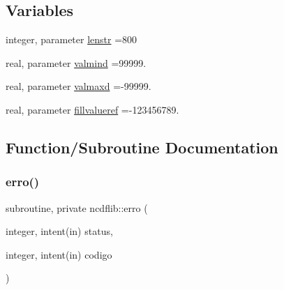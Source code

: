 \subsection*{Variables}
\begin{DoxyCompactItemize}
\item 
integer, parameter \mbox{\hyperlink{namespacencdflib_a7d52315e1d9f473093f6f8fa245ea084}{lenstr}} =800
\item 
real, parameter \mbox{\hyperlink{namespacencdflib_a71ee1a8194dbe6077a815f191502a2ea}{valmind}} =99999.
\item 
real, parameter \mbox{\hyperlink{namespacencdflib_aa581bf8880e7253521fd20a58fe85464}{valmaxd}} =-\/99999.
\item 
real, parameter \mbox{\hyperlink{namespacencdflib_a2dd9900bbac81773f270bfe083fdfbe7}{fillvalueref}} =-\/123456789.
\end{DoxyCompactItemize}


\subsection{Function/\+Subroutine Documentation}
\mbox{\label{namespacencdflib_a67d87694106e0b29a70cb174d730d570}} 
\subsubsection{\texorpdfstring{erro()}{erro()}}
{\footnotesize\ttfamily subroutine, private ncdflib\+::erro (\begin{DoxyParamCaption}\item[{integer, intent(in)}]{status,  }\item[{integer, intent(in)}]{codigo }\end{DoxyParamCaption})\hspace{0.3cm}{\ttfamily [private]}}

